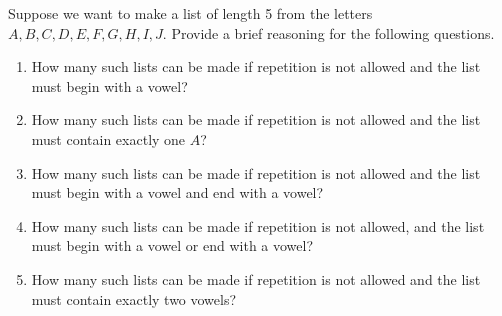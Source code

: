 \documentclass{article}
\theoremstyle{definition}
\begin{document}
\begin{question}
    Suppose we want to make a list of length 5 from the letters $A, B, C, D, E, F, G, H, I, J$. Provide a brief reasoning for the following questions.
        \begin{enumerate}
            \item How many such lists can be made if repetition is not allowed and the list must begin with a vowel?
            \item How many such lists can be made if repetition is not allowed and the list must contain exactly one $A$?
            \item How many such lists can be made if repetition is not allowed and the list must begin with a vowel and end with a vowel?
            \item How many such lists can be made if repetition is not allowed, and the list must begin with a vowel or end with a vowel?
            \item How many such lists can be made if repetition is not allowed and the list must contain exactly two vowels?
        \end{enumerate}
\end{question}
\end{document}
